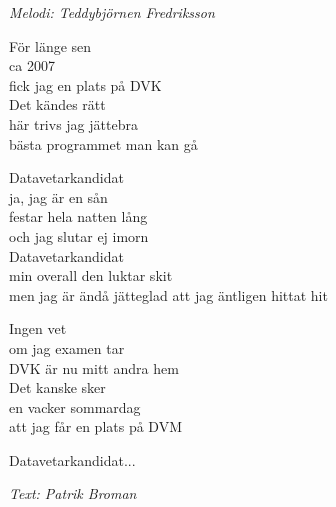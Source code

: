 {\footnotesize\textit{Melodi: Teddybjörnen Fredriksson}}\par
\vspace{10pt}
För länge sen\\
ca 2007\\
fick jag en plats på DVK\\
Det kändes rätt\\
här trivs jag jättebra\\
bästa programmet man kan gå\par
\vspace{10pt}
Datavetarkandidat\\
ja, jag är en sån\\
festar hela natten lång\\
och jag slutar ej imorn\\
Datavetarkandidat\\
min overall den luktar skit\\
men jag är ändå jätteglad att jag äntligen hittat hit\par
\vspace{10pt}
Ingen vet\\
om jag examen tar\\
DVK är nu mitt andra hem\\
Det kanske sker\\
en vacker sommardag\\
att jag får en plats på DVM\par
\vspace{10pt}
Datavetarkandidat...\par
\vspace{10pt}
{\footnotesize\textit{Text: Patrik Broman}}
